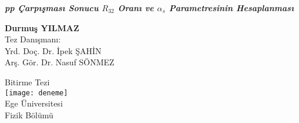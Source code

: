\begin{titlepage}


\begin{center}


              
        \textbf{\large \emph{ pp Çarpışması Sonucu $R_{32}$ Oranı ve $\alpha_s$ Parametresinin Hesaplanması}}
        
        \vspace{0.5cm}
        
        \vspace{1.5cm}
        
        \textbf{Durmuş YILMAZ}\\[4em]
		\centering
        Tez Danışmanı:\\
       	Yrd. Doç. Dr. İpek ŞAHİN\\
       	Arş. Gör. Dr. Nasuf SÖNMEZ\\
       	 
        \vfill
        
        Bitirme Tezi\\[4em]



        
        
       
        

 
			
		\texttt{[image: deneme]} \\
		Ege Üniversitesi\\
		Fizik Bölümü\\
		 
		  
		  
		  
		  
		
     \end{center}   
  \end{titlepage}
